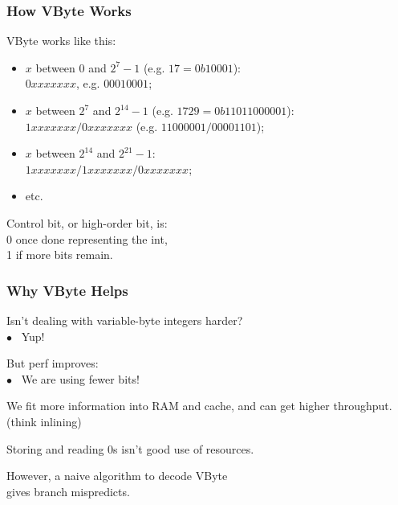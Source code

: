 \begin{frame}
\frametitle{How VByte Works}


VByte works like this:

\begin{itemize}
\item $x$ between 0 and $2^7-1$ (e.g. $17 = 0b10001$):\\
\hspace*{1em}$0xxx xxxx$, e.g. $0001 0001$;
\item $x$ between $2^7$ and $2^{14}-1$ (e.g. $1729 = 0b110 11000001$):\\
\hspace*{1em}                   $1xxx xxxx/0xxx xxxx$ (e.g. $1100 0001/0000 1101$);\\
\item $x$ between $2^{14}$ and $2^{21}-1$: \\
\hspace*{1em}$1xxx xxxx/1xxx xxxx/0xxx xxxx$;
\item etc.
\end{itemize}

Control bit, or high-order bit, is:\\
\hspace*{2em}0 once done representing the int,\\
\hspace*{2em}1 if more bits remain.


\end{frame}



\begin{frame}
\frametitle{Why VByte Helps}


Isn't dealing with variable-byte integers harder?\\
\hspace*{2em} $\bullet$~ Yup!

But perf improves: \\
\hspace*{2em} $\bullet$~  We are using fewer bits! 

We fit more information into RAM and
cache, and can get higher throughput. (think inlining)

Storing and reading 0s isn't good use of resources. 

However, a naive algorithm to decode VByte \\
gives branch mispredicts.

\end{frame}

